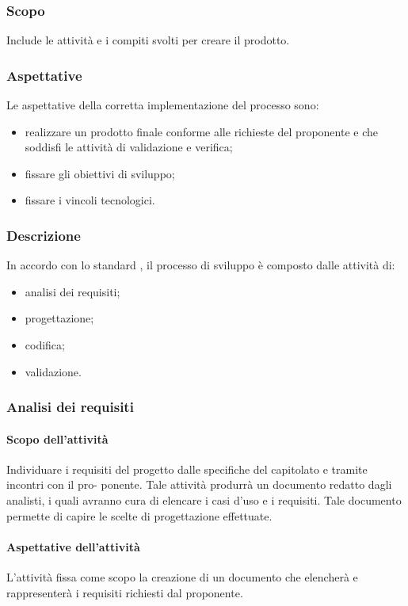 \subsubsection{Scopo}
Include le attività e i compiti svolti per creare il prodotto.
\subsubsection{Aspettative}
Le aspettative della corretta implementazione del processo sono:
\begin{itemize}
		\item realizzare un prodotto finale conforme alle richieste del proponente e che soddisfi le attività di validazione e verifica;
		\item fissare gli obiettivi di sviluppo;
		\item fissare i vincoli tecnologici.
\end{itemize}

\subsubsection{Descrizione}
In accordo con lo standard , il processo di sviluppo è composto dalle attività di:
\begin{itemize}
		\item analisi dei requisiti;
		\item progettazione;
		\item codifica;
		\item validazione.
\end{itemize}

\subsubsection{Analisi dei requisiti}
 \paragraph{Scopo dell'attività}
  Individuare i requisiti del progetto dalle specifiche del capitolato e tramite incontri con il pro-
  ponente. Tale attività produrrà un documento redatto dagli analisti, i quali avranno cura di elencare i casi d'uso e i requisiti. Tale documento permette di
 capire le scelte di progettazione effettuate.
 \paragraph{Aspettative dell'attività}
 L'attività fissa come scopo la creazione di un documento che elencherà e rappresenterà i requisiti richiesti dal proponente.
